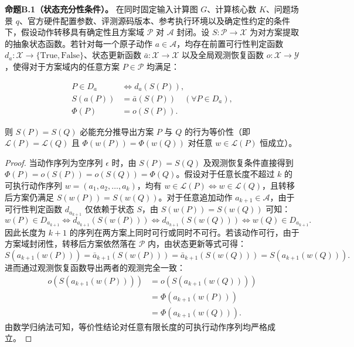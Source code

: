 \documentclass[anonymous,notoc]{gmcm2026}
\begin{document}
\textbf{命题B.1（状态充分性条件）。} 在同时固定输入计算图 \(G\)、计算核心数 \(K\)、问题场景 \(q\)、官方硬件配置参数、评测源码版本、参考执行环境以及确定性约定的条件下，假设动作转移具有确定性且方案域 \(\mathcal{P}\) 对 \(\mathcal{A}\) 封闭。设 \(S: \mathcal{P} \to \mathcal{X}\) 为对方案提取的抽象状态函数。若针对每一个原子动作 \(a \in \mathcal{A}\)，均存在前置可行性判定函数 \(d_a: \mathcal{X} \to \{\text{True}, \text{False}\}\)、状态更新函数 \(\bar{a}: \mathcal{X} \to \mathcal{X}\) 以及全局观测恢复函数 \(o: \mathcal{X} \to \mathcal{Y}\)，使得对于方案域内的任意方案 \(P \in \mathcal{P}\) 均满足：

\begin{equation}
\begin{aligned}
P \in D_a &\iff d_a(S(P)), \\
S(a(P)) &= \bar{a}(S(P)) \quad (\forall P \in D_a), \\
\Phi(P) &= o(S(P)).
\end{aligned}
\end{equation}

则 \(S(P) = S(Q)\) 必能充分推导出方案 \(P\) 与 \(Q\) 的行为等价性（即 \(\mathcal{L}(P) = \mathcal{L}(Q)\) 且 \(\Phi(w(P)) = \Phi(w(Q))\) 对任意 \(w \in \mathcal{L}(P)\) 恒成立）。

\begin{proof} 当动作序列为空序列 \(\epsilon\) 时，由 \(S(P) = S(Q)\) 及观测恢复条件直接得到 \(\Phi(P) = o(S(P)) = o(S(Q)) = \Phi(Q)\)。假设对于任意长度不超过 \(k\) 的可执行动作序列 \(w = (a_1, a_2, \dots, a_k)\)，均有 \(w \in \mathcal{L}(P) \iff w \in \mathcal{L}(Q)\)，且转移后方案仍满足 \(S(w(P)) = S(w(Q))\)。对于任意追加动作 \(a_{k+1} \in \mathcal{A}\)，由于可行性判定函数 \(d_{a_{k+1}}\) 仅依赖于状态 \(S\)，由 \(S(w(P)) = S(w(Q))\) 可知： \begin{equation}
w(P) \in D_{a_{k+1}} \iff d_{a_{k+1}}(S(w(P))) \iff d_{a_{k+1}}(S(w(Q))) \iff w(Q) \in D_{a_{k+1}}.
\end{equation} 因此长度为 \(k+1\) 的序列在两方案上同时可行或同时不可行。若该动作可行，由于方案域封闭性，转移后方案依然落在 \(\mathcal{P}\) 内，由状态更新等式可得： \begin{equation}
S(a_{k+1}(w(P))) = \bar{a}_{k+1}(S(w(P))) = \bar{a}_{k+1}(S(w(Q))) = S(a_{k+1}(w(Q))).
\end{equation} 进而通过观测恢复函数导出两者的观测完全一致： \begin{equation}
\begin{aligned}
o(S(a_{k+1}(w(P)))) &= o(S(a_{k+1}(w(Q)))) \\
&= \Phi(a_{k+1}(w(P))) \\
&= \Phi(a_{k+1}(w(Q))).
\end{aligned}
\end{equation} 由数学归纳法可知，等价性结论对任意有限长度的可执行动作序列均严格成立。 \end{proof}
\end{document}
